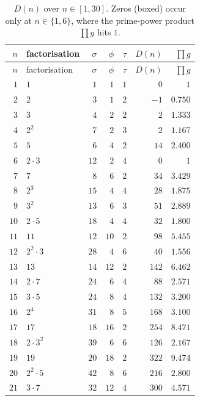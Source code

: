 \documentclass[11pt,a4paper]{article}
\newcommand{\sig}{\sigma}
\theoremstyle{plain}
\theoremstyle{definition}
\begin{document}
\begin{longtable}{r l r r r r r}
\caption{$D(n)$ over $n\in[1,30]$. Zeros (boxed) occur only at $n\in\{1,6\}$,
where the prime-power product $\prod g$ hits $1$.}\\
\toprule
$n$ & factorisation & $\sig$ & $\phi$ & $\tau$ & $D(n)$ & $\prod g$\\
\midrule
\endfirsthead
\toprule
$n$ & factorisation & $\sig$ & $\phi$ & $\tau$ & $D(n)$ & $\prod g$\\
\midrule
\endhead
$1$  & $1$            & $1$  & $1$  & $1$ & $\boxed{0}$ & $1$\\
$2$  & $2$            & $3$  & $1$  & $2$ & $-1$  & $0.750$\\
$3$  & $3$            & $4$  & $2$  & $2$ & $2$   & $1.333$\\
$4$  & $2^2$          & $7$  & $2$  & $3$ & $2$   & $1.167$\\
$5$  & $5$            & $6$  & $4$  & $2$ & $14$  & $2.400$\\
$6$  & $2\cdot3$      & $12$ & $2$  & $4$ & $\boxed{0}$ & $1$\\
$7$  & $7$            & $8$  & $6$  & $2$ & $34$  & $3.429$\\
$8$  & $2^3$          & $15$ & $4$  & $4$ & $28$  & $1.875$\\
$9$  & $3^2$          & $13$ & $6$  & $3$ & $51$  & $2.889$\\
$10$ & $2\cdot5$      & $18$ & $4$  & $4$ & $32$  & $1.800$\\
$11$ & $11$           & $12$ & $10$ & $2$ & $98$  & $5.455$\\
$12$ & $2^2\cdot3$    & $28$ & $4$  & $6$ & $40$  & $1.556$\\
$13$ & $13$           & $14$ & $12$ & $2$ & $142$ & $6.462$\\
$14$ & $2\cdot7$      & $24$ & $6$  & $4$ & $88$  & $2.571$\\
$15$ & $3\cdot5$      & $24$ & $8$  & $4$ & $132$ & $3.200$\\
$16$ & $2^4$          & $31$ & $8$  & $5$ & $168$ & $3.100$\\
$17$ & $17$           & $18$ & $16$ & $2$ & $254$ & $8.471$\\
$18$ & $2\cdot3^2$    & $39$ & $6$  & $6$ & $126$ & $2.167$\\
$19$ & $19$           & $20$ & $18$ & $2$ & $322$ & $9.474$\\
$20$ & $2^2\cdot5$    & $42$ & $8$  & $6$ & $216$ & $2.800$\\
$21$ & $3\cdot7$      & $32$ & $12$ & $4$ & $300$ & $4.571$\\

\end{longtable}
\end{document}
